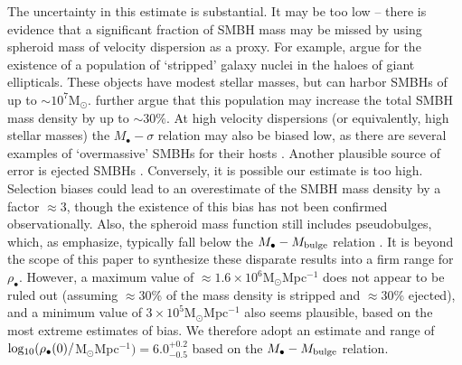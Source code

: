 \documentclass[twocolumn]{aastex631}
\begin{document}
The uncertainty in this estimate is substantial. It may be too low -- there is evidence that a significant fraction of SMBH mass may be missed by using spheroid mass of velocity dispersion as a proxy. For example, \citet{voggel19} argue for the existence of a population of `stripped' galaxy nuclei in the haloes of giant ellipticals. These objects have modest stellar masses, but can harbor SMBHs of up to $\sim10^{7}$M$_{\odot}$. \citet{voggel19} further argue that this population may increase the total SMBH mass density by up to $\sim30\%$. At high velocity dispersions (or equivalently, high stellar masses) the $M_{\bullet}-\sigma$ relation may also be biased low, as there are several examples of `overmassive' SMBHs for their hosts \citep[e.g.][]{dullo21,night23}. Another plausible source of error is ejected SMBHs \citep{postman12,chubol22}.  Conversely, it is possible our estimate is too high. Selection biases \citep{schulze11,2016MNRAS.460.3119S} could lead to an overestimate of the SMBH mass density by a factor $\approx 3$, though the existence of this bias has not been confirmed observationally. Also, the spheroid mass function still includes pseudobulges, which, as \citet{2013ARA&A..51..511K} emphasize, typically fall below the  $M_{\bullet}-M_{\rm bulge}$ relation  \citep[though pseudobulges are typically less massive than classical bulges, making up $\stackrel{<}{_{\sim}}10$\% of the stellar mass density in spheroids]{2008ApJS..175..356H}. It is beyond the scope of this paper to synthesize these disparate results into a firm range for $\rho_{\bullet}$. However, a maximum value of  $\approx 1.6\times10^{6}$M$_{\odot}$Mpc$^{-1}$ does not appear to be ruled out (assuming $\approx 30$\% of the mass density is stripped and $\approx 30$\% ejected), and a minimum value of $3\times10^{5}$M$_{\odot}$Mpc$^{-1}$ also seems plausible, based on the most extreme estimates of bias. We therefore adopt an estimate and range of ${\rm log_{10}}(\rho_{\bullet}(0) /$M$_{\odot}$Mpc$^{-1})=6.0^{+0.2}_{-0.5}$ based on the $M_{\bullet}-M_{\rm bulge}$ relation.
\end{document}
